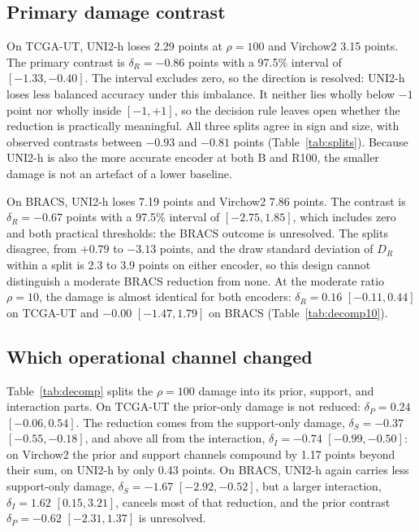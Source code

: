 \subsection{Primary damage contrast}
On TCGA-UT, UNI2-h loses 2.29 points at $\rho=100$ and Virchow2 3.15 points. The primary contrast is $\delta_R=-0.86$ points with a 97.5\% interval of $[-1.33, -0.40]$. The interval excludes zero, so the direction is resolved: UNI2-h loses less balanced accuracy under this imbalance. It neither lies wholly below $-1$ point nor wholly inside $[-1,+1]$, so the decision rule leaves open whether the reduction is practically meaningful. All three splits agree in sign and size, with observed contrasts between $-0.93$ and $-0.81$ points (Table~\ref{tab:splits}). Because UNI2-h is also the more accurate encoder at both B and R100, the smaller damage is not an artefact of a lower baseline.

On BRACS, UNI2-h loses 7.19 points and Virchow2 7.86 points. The contrast is $\delta_R=-0.67$ points with a 97.5\% interval of $[-2.75, 1.85]$, which includes zero and both practical thresholds: the BRACS outcome is unresolved. The splits disagree, from $+0.79$ to $-3.13$ points, and the draw standard deviation of $D_R$ within a split is 2.3 to 3.9 points on either encoder, so this design cannot distinguish a moderate BRACS reduction from none. At the moderate ratio $\rho=10$, the damage is almost identical for both encoders: $\delta_R=0.16$ $[-0.11, 0.44]$ on TCGA-UT and $-0.00$ $[-1.47, 1.79]$ on BRACS (Table~\ref{tab:decomp10}).

\subsection{Which operational channel changed}
Table~\ref{tab:decomp} splits the $\rho=100$ damage into its prior, support, and interaction parts. On TCGA-UT the prior-only damage is not reduced: $\delta_P=0.24$ $[-0.06, 0.54]$. The reduction comes from the support-only damage, $\delta_S=-0.37$ $[-0.55, -0.18]$, and above all from the interaction, $\delta_I=-0.74$ $[-0.99, -0.50]$: on Virchow2 the prior and support channels compound by 1.17 points beyond their sum, on UNI2-h by only 0.43 points. On BRACS, UNI2-h again carries less support-only damage, $\delta_S=-1.67$ $[-2.92, -0.52]$, but a larger interaction, $\delta_I=1.62$ $[0.15, 3.21]$, cancels most of that reduction, and the prior contrast $\delta_P=-0.62$ $[-2.31, 1.37]$ is unresolved.

